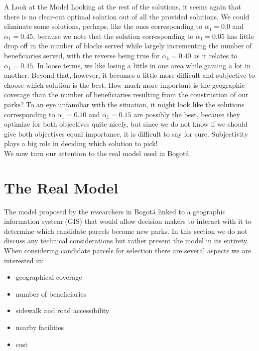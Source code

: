 \documentclass[12pt]{pom_thesis}
\theoremstyle{definition}
\begin{document}
\begin{chapter}{A Look at the Model}
Looking at the rest of the solutions, it seems again that there is no clear-cut optimal solution out of all the provided solutions. We could eliminate some solutions, perhaps, like the ones corresponding to $\alpha_1 = 0.0$ and $\alpha_1 = 0.45$, because we note that the solution corresponding to $\alpha_1 = 0.05$ has little drop off in the number of blocks served while largely incrementing the number of beneficiaries served, with the reverse being true for $\alpha_1 = 0.40$ as it relates to $\alpha_1 = 0.45$. In loose terms, we like losing a little in one area while gaining a lot in another. Beyond that, however, it becomes a little more difficult and subjective to choose which solution is the best. How much more important is the geographic coverage than the number of beneficiaries resulting from the construction of our parks? To an eye unfamiliar with the situation, it might look like the solutions corresponding to $\alpha_1 = 0.10$ and $\alpha_1 = 0.15$ are possibly the best, because they optimize for both objectives quite nicely, but since we do not know if we should give both objectives equal importance, it is difficult to say for sure. Subjectivity plays a big role in deciding which solution to pick! \\

We now turn our attention to the real model used in Bogot\'{a}.
%
%
\section{The Real Model}
The model proposed by the researchers in Bogot\'{a} linked to a geographic information system (GIS) that would allow decision makers to interact with it to determine which candidate parcels become new parks. In this section we do not discuss any technical considerations but rather present the model in its entirety. \\

When considering candidate parcels for selection there are several aspects we are interested in:
\begin{itemize}
\item geographical coverage 
\item number of beneficiaries
\item sidewalk and road accessibility
\item nearby facilities
\item cost 
\end{itemize}


\end{chapter}
\end{document}
